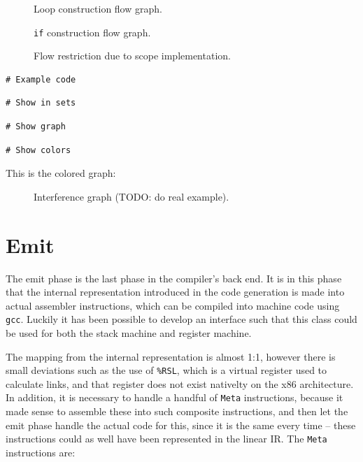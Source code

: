 \begin{figure}[H]
    \centering
    
    \caption{Loop construction flow graph.}
\end{figure}

\begin{figure}[H]
    \centering
    
    \caption{\texttt{if} construction flow graph.}
\end{figure}

\begin{figure}[H]
    \centering
    
    \caption{Flow restriction due to scope implementation.}
\end{figure}

\begin{verbatim}
# Example code
\end{verbatim}

\begin{verbatim}
# Show in sets
\end{verbatim}

\begin{verbatim}
# Show graph
\end{verbatim}

\begin{verbatim}
# Show colors
\end{verbatim}

This is the colored graph:
\begin{figure}[H]
    \centering
    
    \caption{Interference graph (TODO: do real example).}
\end{figure}

\newpage

\section{Emit}
The emit phase is the last phase in the compiler's back end. It is in this phase that the internal representation introduced in the code generation is made into actual assembler instructions, which can be compiled into machine code using \texttt{gcc}. Luckily it has been possible to develop an interface such that this class could be used for both the stack machine and register machine.

The mapping from the internal representation is almost 1:1, however there is small deviations such as the use of \texttt{\%RSL}, which is a virtual register used to calculate links, and that register does not exist nativelty on the x86 architecture. In addition, it is necessary to handle a handful of \texttt{Meta} instructions, because it made sense to assemble these into such composite instructions, and then let the emit phase handle the actual code for this, since it is the same every time -- these instructions could as well have been represented in the linear IR. The \texttt{Meta} instructions are:

